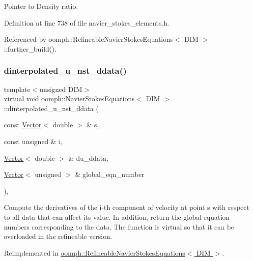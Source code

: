 Pointer to Density ratio. 



Definition at line 738 of file navier\+\_\+stokes\+\_\+elements.\+h.



Referenced by oomph\+::\+Refineable\+Navier\+Stokes\+Equations$<$ D\+I\+M $>$\+::further\+\_\+build().

\mbox{\label{classoomph_1_1NavierStokesEquations_aa516b523d6c3b83a01c1bd1e1f9569fe}} 
\subsubsection{\texorpdfstring{dinterpolated\+\_\+u\+\_\+nst\+\_\+ddata()}{dinterpolated\_u\_nst\_ddata()}}
{\footnotesize\ttfamily template$<$unsigned D\+IM$>$ \\
virtual void \hyperlink{classoomph_1_1NavierStokesEquations}{oomph\+::\+Navier\+Stokes\+Equations}$<$ D\+IM $>$\+::dinterpolated\+\_\+u\+\_\+nst\+\_\+ddata (\begin{DoxyParamCaption}\item[{const \hyperlink{classoomph_1_1Vector}{Vector}$<$ double $>$ \&}]{s,  }\item[{const unsigned \&}]{i,  }\item[{\hyperlink{classoomph_1_1Vector}{Vector}$<$ double $>$ \&}]{du\+\_\+ddata,  }\item[{\hyperlink{classoomph_1_1Vector}{Vector}$<$ unsigned $>$ \&}]{global\+\_\+eqn\+\_\+number }\end{DoxyParamCaption})\hspace{0.3cm}{\ttfamily [inline]}, {\ttfamily [virtual]}}



Compute the derivatives of the i-\/th component of velocity at point s with respect to all data that can affect its value. In addition, return the global equation numbers corresponding to the data. The function is virtual so that it can be overloaded in the refineable version. 



Reimplemented in \hyperlink{classoomph_1_1RefineableNavierStokesEquations_a7cfd72b42cc9fc665fa79ffe9af9f0bd}{oomph\+::\+Refineable\+Navier\+Stokes\+Equations$<$ D\+I\+M $>$}.



